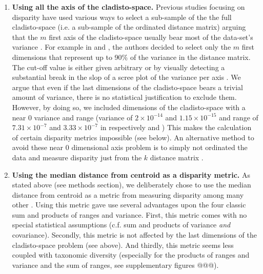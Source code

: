 \documentclass[12pt,letterpaper]{article}
\begin{document}
\begin{enumerate}
    \item \textbf{Using all the axis of the cladisto-space.}
    Previous studies focusing on disparity have used various ways to select a sub-sample of the the full cladisto-space (i.e. a sub-sample of the ordinated distance matrix) arguing that the $m$ first axis of the cladisto-space usually bear most of the data-set's variance \citep[e.g][]{brusatte50,cisneros2010,prentice2011,anderson2012using,Hughes20082013,bentonmodels2014}.
    For example in \cite{Brusatte12092008} and \cite{toljagictriassic-jurassic2013}, the authors decided to select only the $m$ first dimensions that represent up to 90\% of the variance in the distance matrix.
    The cut-off value is either given arbitrary or by visually detecting a substantial break in the slop of a scree plot of the variance per axis \citep{Wills1994}.
    We argue that even if the last dimensions of the cladisto-space bears a trivial amount of variance, there is no statistical justification to exclude them.
    However, by doing so, we included dimensions of the cladisto-space with a near 0 variance and range (variance of $2\times10^{-14}$ and $1.15\times10^{-15}$ and range of $7.31\times10^{-7}$ and $3.33\times10^{-7}$ in respectively \citealt{Slater2012MEE} and \citealt{beckancient2014})
    This makes the calculation of certain disparity metrics impossible (see below).
    An alternative method to avoid these near 0 dimensional axis problem is to simply not ordinated the data and measure disparity just from the $k$ distance matrix \citep[e.g.][]{bensonfaunal2014,Close2015}.
    \item \textbf{Using the median distance from centroid as a disparity metric.}    
    As stated above (see methods section), we deliberately chose to use the median distance from centroid as a metric from measuring disparity among many other \citep[e.g.][]{Wills1994,Ciampaglio2004,thorneresetting2011,hopkinsdecoupling2013,huang2015origins}.
    Using this metric gave use several advantages upon the four classic sum and products of ranges and variance.
    First, this metric comes with no special statistical assumptions (c.f. sum and products of variance \textit{and} covariance). %
    Secondly, this metric is not affected by the last dimensions of the cladisto-space problem (see above).
    And thirdly, this metric seems less coupled with taxonomic diversity (especially for the products of ranges and variance and the sum of ranges, see supplementary figures @@@).

\end{enumerate}
\end{document}
